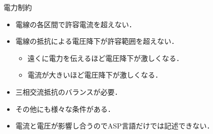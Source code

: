 \documentclass[dvipdfmx,11pt]{beamer}
\begin{document}
\begin{frame}{電力制約}
 \begin{itemize}
  \item 電線の各区間で\alert{許容電流を超えない}．
  \item 電線の抵抗による\alert{電圧降下が許容範囲を超えない}．
		\begin{itemize}
		 \item 遠くに電力を伝えるほど電圧降下が激しくなる．
		 \item 電流が大きいほど電圧降下が激しくなる．
		\end{itemize}
  \item 三相交流抵抗のバランスが必要．
  \item その他にも様々な条件がある．
  \item 電流と電圧が影響し合うのでASP言語だけでは記述できない．
 \end{itemize}
\end{frame}
\end{document}
